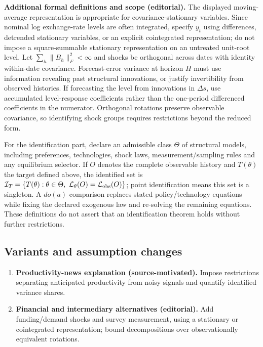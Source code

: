 \documentclass[11pt,a4paper]{article}
\begin{document}
\textbf{Additional formal definitions and scope (editorial).} The displayed moving-average representation is appropriate for covariance-stationary variables. Since nominal log exchange-rate levels are often integrated, specify \(y_t\) using differences, detrended stationary variables, or an explicit cointegrated representation; do not impose a square-summable stationary representation on an untreated unit-root level. Let \(\sum_h\|B_h\|_F^2<\infty\) and shocks be orthogonal across dates with identity within-date covariance. Forecast-error variance at horizon \(H\) must use information revealing past structural innovations, or justify invertibility from observed histories. If forecasting the level from innovations in \(\Delta s\), use accumulated level-response coefficients rather than the one-period differenced coefficients in the numerator. Orthogonal rotations preserve observable covariance, so identifying shock groups requires restrictions beyond the reduced form.

For the identification part, declare an admissible class \(\Theta\) of structural models, including preferences, technologies, shock laws, measurement/sampling rules and any equilibrium selector. If \(O\) denotes the complete observable history and \(T(\theta)\) the target defined above, the identified set is \(\mathcal I_T=\{T(\theta):\theta\in\Theta,\ \mathcal L_\theta(O)=\mathcal L_{\rm obs}(O)\}\); point identification means this set is a singleton. A \(do(a)\) comparison replaces stated policy/technology equations while fixing the declared exogenous law and re-solving the remaining equations. These definitions do not assert that an identification theorem holds without further restrictions.
\subsection*{Variants and assumption changes}
\begin{enumerate}
\item \textbf{Productivity-news explanation (source-motivated).} Impose restrictions separating anticipated productivity from noisy signals and quantify identified variance shares.
\item \textbf{Financial and intermediary alternatives (editorial).} Add funding/demand shocks and survey measurement, using a stationary or cointegrated representation; bound decompositions over observationally equivalent rotations.
\end{enumerate}
\end{document}
